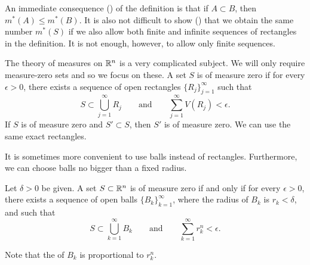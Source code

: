 \begin{myfigureht}
\caption{Outer measure construction, in this case $S \subset R_1 \cup R_2
\cup R_3 \cup \cdots$, so $m^*(S) \leq V(R_1) + V(R_2)+V(R_3) + \cdots$.\label{fig:outermeasure}}
\end{myfigureht}

An immediate consequence ()
of the definition is that if $A \subset B$,
then $m^*(A) \leq m^*(B)$.
It is also not difficult to show ()
that we obtain the same number
$m^*(S)$ if we also allow both finite and infinite sequences
of rectangles in the definition.  It is not enough, however, to allow only
finite sequences.

The theory of measures on ${\mathbb{R}}^n$ is a very complicated subject.
We will only require measure-zero sets and so we focus on these.
A set $S$ is of measure zero if
for every $\epsilon > 0$,
there exists a sequence of open rectangles $\{ R_j \}_{j=1}^\infty$ such that
\begin{equation} \label{mv:eq:nullR}
S \subset \bigcup_{j=1}^\infty R_j \qquad \text{and} \qquad
\sum_{j=1}^\infty V(R_j) < \epsilon.
\end{equation}
If $S$ is of measure zero and $S' \subset S$, then
$S'$ is of measure zero.  We can use the same exact rectangles.

\pagebreak[2]
It is sometimes more convenient to use balls instead of rectangles.
Furthermore, we can
choose balls no bigger than a fixed radius.

\begin{prop} \label{mv:prop:ballsnull}
Let $\delta > 0$ be given.
A set $S \subset {\mathbb{R}}^n$ is of measure zero if and only if for every $\epsilon >
0$, there exists a sequence of open balls $\{ B_k \}_{k=1}^\infty$, where the radius of
$B_k$ is $r_k < \delta$, and such that
\begin{equation*}
S \subset \bigcup_{k=1}^\infty B_k \qquad \text{and} \qquad
\sum_{k=1}^\infty r_k^n < \epsilon.
\end{equation*}
\end{prop}

Note that the  of $B_k$ is proportional to $r_k^n$.


